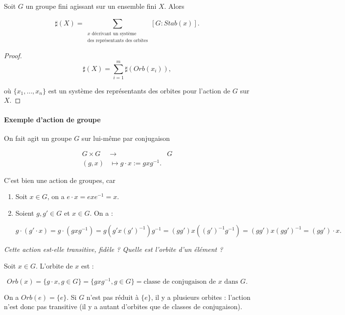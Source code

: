 \documentclass[french]{book}
\begin{document}
\begin{thm}
  Soit $G$ un groupe fini agissant sur un ensemble fini $X$. Alors

  \[
  \sharp(X) = \sum_{\substack{x \text{ décrivant un système} \\ \text{des représentants des orbites} }}^{} [G:Stab(x)].
  \]
\end{thm}

\begin{proof}
  \[
  \sharp(X) = \sum_{i=1}^{m} \sharp(Orb(x_i)),
  \]

  où $\{ x_1, \dots, x_n \}$ est un système des représentants des orbites pour l'action de $G$ sur $X$.
\end{proof}

\paragraph{Exemple d'action de groupe}

 On fait agit un groupe $G$ sur lui-même par conjugaison

 \[
   \begin{array}{rcl}
   G \times G & \longrightarrow & G \\
   (g,x) & \longmapsto g \cdot x := g x g ^{-1} .
   \end{array}
 \]

C'est bien une action de groupes, car

\begin{enumerate}
  \item Soit $x \in G$, on a $e \cdot x = e x e ^{-1} =x$.
  \item Soient $g, g' \in G$ et $x \in G$. On a :

  \[
  g \cdot (g' \cdot x) = g \cdot (g x g ^{-1} )=g(g'x (g')^{-1} ) g ^{-1} = (gg') x ((g')^{-1} g ^{-1} ) = (gg')x(gg') ^{-1} = (gg')\cdot x.
  \]
\end{enumerate}

\emph{Cette action est-elle transitive, fidèle ? Quelle est l'orbite d'un élément ?}


Soit $x \in G$. L'orbite de $x$ est :

\[
Orb(x) = \{ g \cdot x, g \in G \} = \{ g x g ^{-1} , g \in G \} = \text{classe de conjugaison de } x \text{ dans } G.
\]

On a $Orb(e) = \{ e \} $. Si $G$ n'est pas réduit à $\{ e \} $, il y a plusieurs orbites : l'action n'est donc pas transitive (il y a autant d'orbites que de classes de conjugaison).
\end{document}
